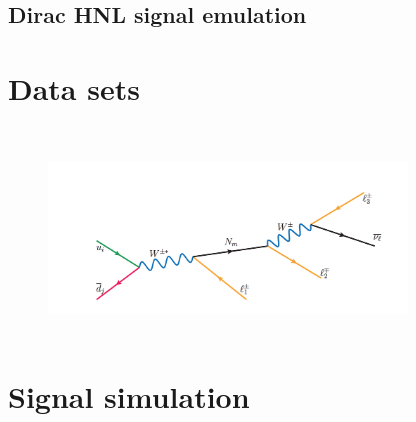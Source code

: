 \subsection{Dirac HNL signal emulation}\label{sec:c4diracmajo}
\section{Data sets}\label{sec:c4data}
~\cite{Degrande_2016}
~\cite{Pascoli_2019}
~\cite{cirigliano2021leptonic}




\begin{figure}[h!]
\centering
 \includegraphics[width=0.85\textwidth]{Figures/c4/hnl_graph}
  \caption{~\cite{Pascoli_2019}}
  \label{fig:c46}
\end{figure}


\section{Signal simulation}
\label{sec:signal}


